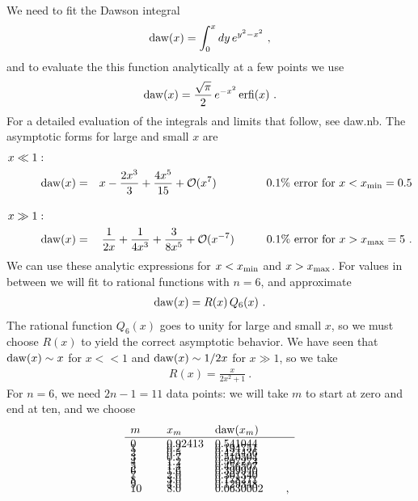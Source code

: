 \documentclass[preprint,12pt,eqsecnum,nofootinbib,amsmath,amssymb]{revtex4}
\begin{document}
We need to fit the Dawson integral
\begin{eqnarray}
  {\rm daw}(x) = \int_0^x dy\, e^{y^2-x^2} \ ,
\end{eqnarray}
and to evaluate the this function analytically at a few 
points we use 
\begin{eqnarray}
  {\rm daw}(x) =  \frac{\sqrt{\pi}}{2}\, 
  e^{-x^2}\,{\rm erfi}(x) \ .
\end{eqnarray}
For a detailed evaluation of the integrals and limits
that follow, see daw.nb. The asymptotic forms for large 
and small $x$ are
\begin{eqnarray}
\nonumber
  x \ll 1: \hskip1cm \\  
  {\rm daw}(x) &=& x - \frac{2x^3}{3} +
  \frac{4 x^5}{15} + {\cal O}(x^7) 
  \hskip1.55cm 0.1\% {\rm ~error~for~} x < x_{\rm min}=0.5
\\[10pt]
\nonumber
  x \gg 1: \hskip1cm \\  
  {\rm daw}(x) &=& \frac{1}{2x} + \frac{1}{4 x^3} +
  \frac{3}{8 x^5} + {\cal O}(x^{-7}) 
  \hskip1cm 0.1\% {\rm ~error~for~} x > x_{\rm max}=5\ .
\end{eqnarray}
We can use these analytic expressions for $x<x_{\rm min}$
and $x>x_{\rm max}$. For values in between we will fit
to rational functions with $n=6$, and approximate 
\begin{eqnarray}
  {\rm daw}(x) = R(x) \, Q_6(x) \ .
\end{eqnarray}
The rational function $Q_6(x)$ goes to unity for large and 
small $x$, so we must choose $R(x)$ to yield the correct 
asymptotic behavior. We have seen that ${\rm daw}(x) \sim x$
for $x << 1$ and ${\rm daw}(x) \sim 1/2x$ for $x \gg 1$,
so we take 
\begin{eqnarray}
  R(x)=\frac{x}{2 x^2 +1} \ .
\end{eqnarray}
For $n=6$, we need $2n-1=11$ data points: we will take
$m$ to start at zero and end at ten, and we choose 
\begin{eqnarray}
\begin{array}{lll}
  m~~~~ & x_m~~~ & {\rm daw}(x_m)   \\ \hline
  0    & 0.92413   &   0.541044     \\[-8pt]
  1    & 0.2       &   0.194751     \\[-8pt]
  2    & 0.5       &   0.424436     \\[-8pt]
  3    & 0.7       &   0.510504     \\[-8pt]
  4    & 1.2       &   0.507273     \\[-8pt]
  5    & 1.4       &   0.456507     \\[-8pt]
  6    & 1.6       &   0.399940     \\[-8pt]
  7    & 2.0       &   0.301340     \\[-8pt]
  8    & 3.0       &   0.178271     \\[-8pt]
  9    & 4.0       &   0.129348     \\[-8pt]
 10    & 8.0       &   0.0630002 ~~~~~~,
\end{array}
\end{eqnarray}
\end{document}
